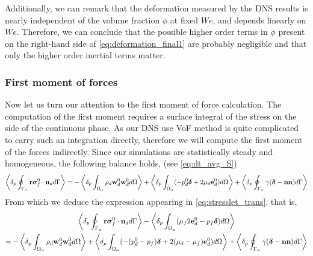 Additionally, we can remark that the deformation measured by the DNS results is nearly independent of the volume fraction $\phi$ at fixed $We$, and depends linearly on $We$. 
Therefore, we can conclude that the possible higher order terms in $\phi$ present on the right-hand side of \ref{eq:deformation_final1} are probably negligible and that only the higher order inertial terms matter. 


\subsubsection{First moment of forces}

Now let us turn our attention to the first moment of force calculation. 
The computation of the first moment requires a surface integral of the stress on the side of the continuous phase. 
As our DNS use VoF method is quite complicated to carry such an integration directly, therefore we will compute the first moment of the forces indirectly. 
Since our simulations are statistically steady and homogeneous, the following balance holds, (see \ref{eq:dt_avg_S})
\begin{equation}
    \left<\delta_p \oint_{\Gamma_{\alpha}} \textbf{r}\bm\sigma_f^0\cdot \textbf{n}_d d\Gamma\right>
    = 
    - \left<\delta_p \int_{\Omega_{\alpha}} \rho_d \textbf{w}_d^0  \textbf{w}_d^0  d\Omega\right>
    + \left<\delta_p \int_{\Omega_{\alpha}} (-p_d^0 \bm\delta + 2\mu_d \textbf{e}_d^0) d\Omega\right>
    +  \left<\delta_p \oint_{\Gamma_{\alpha}} \gamma (\bm\delta - \textbf{nn}) d\Gamma\right>
\end{equation}
From which we deduce the expression appearing in \ref{eq:stresslet_trans}, that is, 
\begin{multline}
    \left<\delta_p \oint_{\Gamma_{\alpha}} \textbf{r}\bm\sigma_f^0\cdot \textbf{n}_d d\Gamma\right>
    - \left<\delta_p \int_{\Omega_{\alpha}} (\mu_f 2 \textbf{e}_d^0  -  p_f\bm\delta) d\Omega\right>\\
    = 
    - \left<\delta_p \int_{\Omega_{\alpha}} \rho_d \textbf{w}_d^0  \textbf{w}_d^0  d\Omega\right>
    + \left<\delta_p \int_{\Omega_{\alpha}} (-(p_d^0-p_f) \bm\delta + 2(\mu_d-\mu_f) \textbf{e}_d^0) d\Omega\right>
    +  \left<\delta_p \oint_{\Gamma_{\alpha}} \gamma (\bm\delta - \textbf{nn}) d\Gamma\right>
\end{multline}



